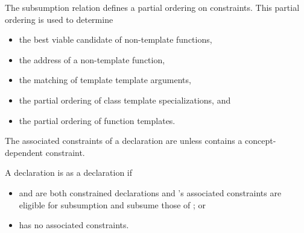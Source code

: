 \pnum
\begin{note}
The subsumption relation defines a partial ordering on constraints.
This partial ordering is used to determine
\begin{itemize}
\item the best viable candidate of non-template functions,
\item the address of a non-template function,
\item the matching of template template arguments,
\item the partial ordering of class template specializations, and
\item the partial ordering of function templates.
\end{itemize}
\end{note}

\pnum
The associated constraints  of a declaration 
%
are 
unless  contains a concept-dependent constraint.

\pnum
A declaration  is
 as
a declaration  if
\begin{itemize}
\item {} and  are both constrained declarations and
's associated constraints
are eligible for subsumption and subsume those of ; or

\item {} has no associated constraints.
\end{itemize}

